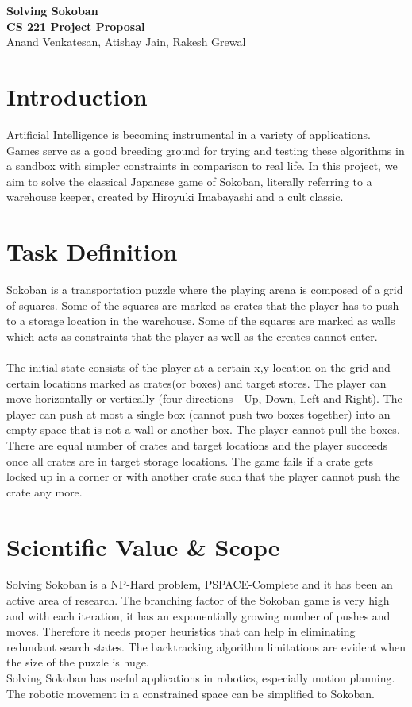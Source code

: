 \documentclass[10pt, final]{article}
\begin{document}
	
	\begin{center}
		\LARGE{\textbf{Solving Sokoban}}\\
		\Large{\textbf{CS 221 Project Proposal}}\\
		\Large{Anand Venkatesan, Atishay Jain, Rakesh Grewal }
	\end{center}
	
	\section{Introduction}
	Artificial Intelligence is becoming instrumental in a variety of applications. Games serve as a good breeding ground for trying and testing these algorithms in a sandbox with simpler constraints in comparison to real life. In this project, we aim to solve the classical Japanese game of Sokoban, literally referring to a warehouse keeper, created by Hiroyuki Imabayashi and a cult classic.
	
	\section{Task Definition}
	Sokoban is a transportation puzzle where the playing arena is composed of a grid of squares. Some of the squares are marked as crates that the player has to push to a storage location in the warehouse. Some of the squares are marked as walls which acts as constraints that the player as well as the creates cannot enter. \\
	\\
	The initial state consists of the player at a certain x,y location on the grid and certain locations marked as crates(or boxes) and target stores. The player can move horizontally or vertically (four directions - Up, Down, Left and Right). The player can push at most a single box (cannot push two boxes together) into an empty space that is not a wall or another box. The player cannot pull the boxes. There are equal number of crates and target locations and the player succeeds once all crates are in target storage locations. The game fails if a crate gets locked up in a corner or with another crate such that the player cannot push the crate any more.
	
	\section{Scientific Value \& Scope}
	Solving Sokoban is a NP-Hard problem, PSPACE-Complete\cite{1} and it has been an active area of research. The branching factor of the Sokoban game is very high and with each iteration, it has an exponentially growing number of pushes and moves. Therefore it needs proper heuristics that can help in eliminating redundant search states. The backtracking algorithm limitations are evident when the size of the puzzle is huge. \\
	Solving Sokoban has useful applications in robotics, especially motion planning. The robotic movement in a constrained space can be simplified to Sokoban.
	
\end{document}
